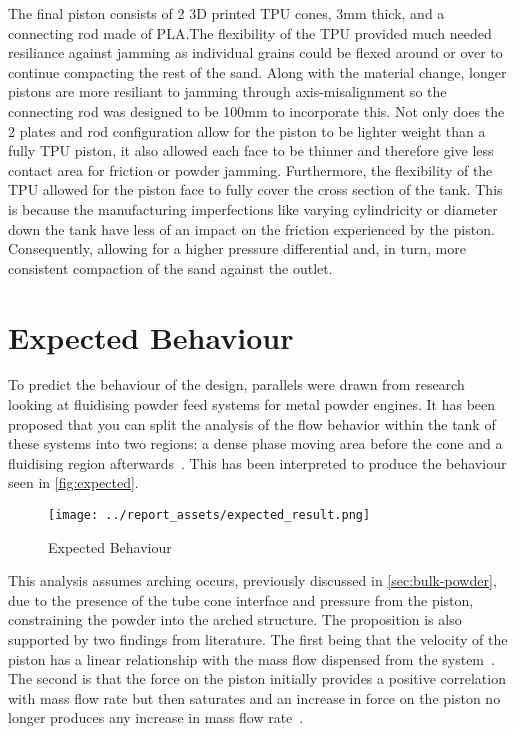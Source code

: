 The final piston consists of 2 3D printed TPU cones, 3mm thick, and a connecting rod made of PLA.\@ The flexibility of the TPU provided much needed resiliance against jamming as individual grains could be flexed around or over to continue compacting the rest of the sand. Along with the material change, longer pistons are more resiliant to jamming through axis-misalignment so the connecting rod was designed to be 100mm to incorporate this. Not only does the 2 plates and rod configuration allow for the piston to be lighter weight than a fully TPU piston, it also allowed each face to be thinner and therefore give less contact area for friction or powder jamming. Furthermore, the flexibility of the TPU allowed for the piston face to fully cover the cross section of the tank. This is because the manufacturing imperfections like varying cylindricity or diameter down the tank have less of an impact on the friction experienced by the piston. Consequently, allowing for a higher pressure differential and, in turn, more consistent compaction of the sand against the outlet.

\section{Expected Behaviour}\label{sec:expected-behaviour}
To predict the behaviour of the design, parallels were drawn from research looking at fluidising powder feed systems for metal powder engines. It has been proposed that you can split the analysis of the flow behavior within the tank of these systems into two regions: a dense phase moving area before the cone and a fluidising region afterwards~\cite{Tang22}. This has been interpreted to produce the behaviour seen in \autoref{fig:expected}. 
\begin{figure}[htbp]
    \centering
    
    \begin{minipage}{0.6\textwidth}
        \centering
        \texttt{[image: ../report\_assets/expected\_result.png]}
        \caption{Expected Behaviour}\label{fig:expected}
    \end{minipage}
    
\end{figure}
This analysis assumes arching occurs, previously discussed in \autoref{sec:bulk-powder}, due to the presence of the tube cone interface and pressure from the piston, constraining the powder into the arched structure. The proposition is also supported by two findings from literature. The first being that the velocity of the piston has a linear relationship with the mass flow dispensed from the system~\cite{SUN201630}. The second is that the force on the piston initially provides a positive correlation with mass flow rate but then saturates and an increase in force on the piston no longer produces any increase in mass flow rate~\cite{LI2021712}. 

